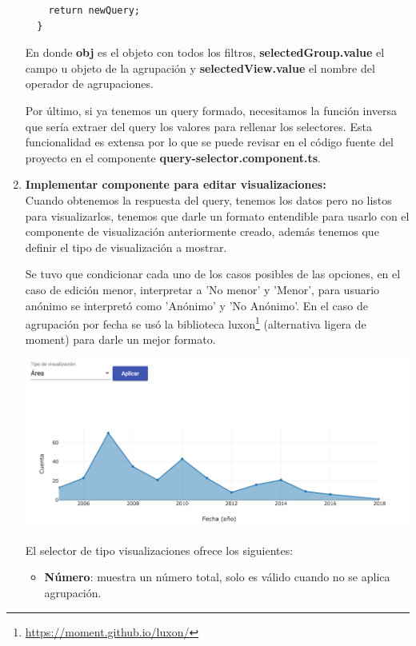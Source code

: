 \begin{enumerate}
\begin{verbatim}
    return newQuery;
  }
  \end{verbatim}
  
  En donde \textbf{obj} es el objeto con todos los filtros, \textbf{selectedGroup.value} el campo u objeto de la agrupación y \textbf{selectedView.value} el nombre del operador de agrupaciones.
  
  Por último, si ya tenemos un query formado, necesitamos la función inversa que sería extraer del query los valores para rellenar los selectores. Esta funcionalidad es extensa por lo que se puede revisar en el código fuente del proyecto en el componente \textbf{query-selector.component.ts}.
  
  \item\textbf{Implementar componente para editar visualizaciones:}\\

  Cuando obtenemos la respuesta del query, tenemos los datos pero no listos para visualizarlos, tenemos que darle un formato entendible para usarlo con el componente de visualización anteriormente creado, además tenemos que definir el tipo de visualización a mostrar.
  
  
  Se tuvo que condicionar cada uno de los casos posibles de las opciones, en el caso de edición menor, interpretar a 'No menor' y 'Menor', para usuario anónimo se interpretó como 'Anónimo' y 'No Anónimo'. En el caso de agrupación por fecha se usó la biblioteca luxon\footnote{\url{https://moment.github.io/luxon/}} (alternativa ligera de moment) para darle un mejor formato.
  
  
  \begin{center}
      \bigbreak
      \includegraphics[scale=0.35]{images/marco_aplicativo/edit_vis.png}
      \label{fig:edit_vis}
      \bigbreak
  \end{center}
  
  El selector de tipo visualizaciones ofrece los siguientes:
  \begin{itemize}
    \item\textbf{Número}: muestra un número total, solo es válido cuando no se aplica agrupación.
    

\end{itemize}
\end{enumerate}
